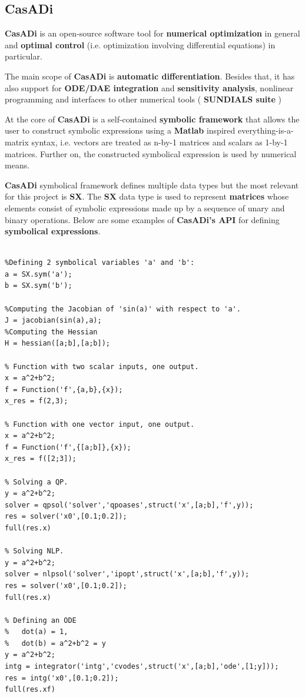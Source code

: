 \documentclass[12pt, letterpaper]{article}
\begin{document}
\subsection{CasADi}
\label{CasADi_section}

\textbf{CasADi} is an open-source software tool for \textbf{numerical optimization} in general and \textbf{optimal control} (i.e. optimization involving differential equations) in particular. \cite{Andersson2018}

The main scope of \textbf{CasADi} is \textbf{automatic differentiation}. Besides that, it has also support for \textbf{ODE/DAE integration} and \textbf{sensitivity analysis}, nonlinear programming and interfaces to other numerical tools ( \textbf{SUNDIALS suite} )

At the core of \textbf{CasADi} is a self-contained \textbf{symbolic framework} that allows the user to construct symbolic expressions using a \textbf{ Matlab} inspired everything-is-a-matrix syntax, i.e. vectors are treated as n-by-1 matrices and scalars as 1-by-1 matrices. Further on, the constructed symbolical expression is used by numerical means.

\textbf{CasADi} symbolical framework defines multiple data types but the most relevant for this project is \textbf{SX}. The \textbf{SX} data type is used to represent \textbf{matrices} whose elements consist of symbolic expressions made up by a sequence of unary and binary operations.
Below are some examples of \textbf{CasADi's  API} for defining \textbf{symbolical expressions}.

\begin{lstlisting}

%Defining 2 symbolical variables 'a' and 'b':
a = SX.sym('a');
b = SX.sym('b');

%Computing the Jacobian of 'sin(a)' with respect to 'a'.
J = jacobian(sin(a),a);
%Computing the Hessian
H = hessian([a;b],[a;b]);

% Function with two scalar inputs, one output.
x = a^2+b^2;
f = Function('f',{a,b},{x});
x_res = f(2,3);

% Function with one vector input, one output.
x = a^2+b^2;
f = Function('f',{[a;b]},{x});
x_res = f([2;3]);

% Solving a QP.
y = a^2+b^2;
solver = qpsol('solver','qpoases',struct('x',[a;b],'f',y));
res = solver('x0',[0.1;0.2]);
full(res.x)

% Solving NLP.
y = a^2+b^2;
solver = nlpsol('solver','ipopt',struct('x',[a;b],'f',y));
res = solver('x0',[0.1;0.2]);
full(res.x)

% Defining an ODE
%   dot(a) = 1,
%   dot(b) = a^2+b^2 = y 
y = a^2+b^2;
intg = integrator('intg','cvodes',struct('x',[a;b],'ode',[1;y]));
res = intg('x0',[0.1;0.2]);
full(res.xf)

\end{lstlisting}
\end{document}

